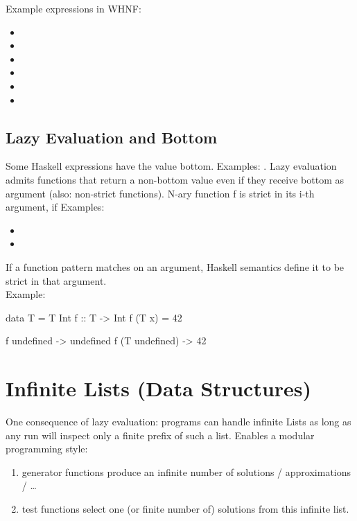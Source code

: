 Example expressions in WHNF:
\begin{itemize}
   \item {}
   \item {}
   \item {}
   \item {}
   \item {}
   \item {}
\end{itemize}

\subsection{Lazy Evaluation and Bottom}
Some Haskell expressions have the value bottom. Examples: . Lazy evaluation admits functions that return a non-bottom value even if they receive bottom as argument (also: non-strict functions).
N-ary function f is strict in its i-th argument, if 
Examples:
\begin{itemize}
   \item {}
   \item {}
\end{itemize}
If a function pattern matches on an argument, Haskell semantics define it to be strict in that argument.\\
Example:\\
\begin{Haskell}
data T = T Int
f :: T -> Int
f (T x) = 42

f undefined -> undefined
f (T undefined) -> 42
\end{Haskell}



\section{Infinite Lists (Data Structures)}
One consequence of lazy evaluation: programs can handle infinite Lists as long as any run will inspect only a finite prefix of such a list.
Enables a modular programming style:
\begin{enumerate}
   \item generator functions produce an infinite number of solutions / approximations / \dots
   \item test functions select one (or finite number of) solutions from this infinite list.
\end{enumerate}


